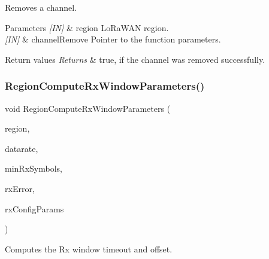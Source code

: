 Removes a channel. 


\begin{DoxyParams}{Parameters}
{\em \mbox{[}\+I\+N\mbox{]}} & region Lo\+Ra\+W\+AN region.\\
\hline
{\em \mbox{[}\+I\+N\mbox{]}} & channel\+Remove Pointer to the function parameters.\\
\hline
\end{DoxyParams}

\begin{DoxyRetVals}{Return values}
{\em Returns} & true, if the channel was removed successfully. \\
\hline
\end{DoxyRetVals}
\mbox{\label{group__REGION_gabd3eb4e7db9b7987fabb9568f733a2b9}} 
\subsubsection{\texorpdfstring{Region\+Compute\+Rx\+Window\+Parameters()}{RegionComputeRxWindowParameters()}}
{\footnotesize\ttfamily void Region\+Compute\+Rx\+Window\+Parameters (\begin{DoxyParamCaption}\item[{\hyperlink{group__LORAMAC_ga80c48efda9ae02e14b58160d34a798dd}{Lo\+Ra\+Mac\+Region\+\_\+t}}]{region,  }\item[{int8\+\_\+t}]{datarate,  }\item[{uint8\+\_\+t}]{min\+Rx\+Symbols,  }\item[{uint32\+\_\+t}]{rx\+Error,  }\item[{\hyperlink{group__REGION_ga375c038078dfcfc7ef14280021db719e}{Rx\+Config\+Params\+\_\+t} $\ast$}]{rx\+Config\+Params }\end{DoxyParamCaption})}

Computes the Rx window timeout and offset.


